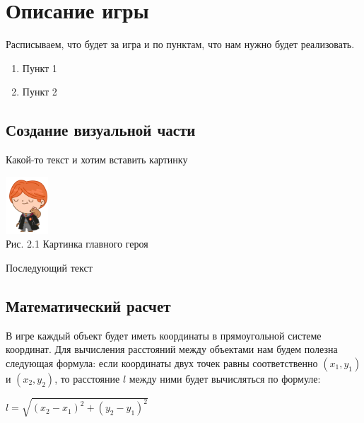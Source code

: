 \chapter{Описание игры}

Расписываем, что будет за игра и по пунктам, что нам нужно будет реализовать.

\begin{enumerate}
    \item Пункт 1
    \item Пункт 2
\end{enumerate}

\section{Создание визуальной части}

Какой-то текст и хотим вставить картинку

\begin{center}
 {\includegraphics[keepaspectratio=true,scale=1]{images/chapter2/ron.png} \\ Рис. 2.1 Картинка главного героя}
 \end{center}

 Последующий текст


\section{Математический расчет}

В игре каждый объект будет иметь координаты в прямоугольной системе координат. Для вычисления расстояний между объектами нам будем полезна следующая формула: если координаты двух точек равны соответственно $(x_1, y_1)$ и $(x_2, y_2)$, то расстояние $l$ между ними будет вычисляться по формуле:

\begin{center}
    $l = \sqrt{(x_2 - x_1)^2 + (y_2 - y_1)^2}$
\end{center}